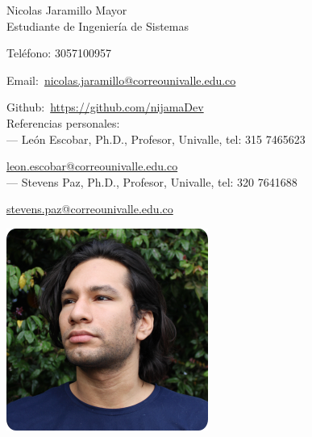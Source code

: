 \documentclass{article}
\begin{document}
\pagestyle{empty} %
\begin{center}
  {\LARGE Nicolas Jaramillo Mayor} \\
  \vspace{0.2cm}
  Estudiante de Ingeniería de Sistemas
\end{center}
\noindent\begin{minipage}{0.6\textwidth}
  Teléfono: 3057100957

  Email:~\href{mailto:nicolas.jaramillo@correounivalle.edu.co}{nicolas.jaramillo@correounivalle.edu.co}

  Github:~\href{https://github.com/nijamaDev}{https://github.com/nijamaDev} \\

  Referencias personales:  \\
  --- León Escobar, Ph.D., Profesor, Univalle, tel: 315 7465623

  \href{mailto:leon.escobar@correounivalle.edu.co}{leon.escobar@correounivalle.edu.co}
  \\
  --- Stevens Paz, Ph.D., Profesor, Univalle, tel: 320 7641688

  \href{mailto:stevens.paz@correounivalle.edu.co}{stevens.paz@correounivalle.edu.co}

\end{minipage}
\hfill
\begin{minipage}{0.2\textwidth}
  \includegraphics[width=\textwidth]{pp.png}
\end{minipage}
\end{document}
